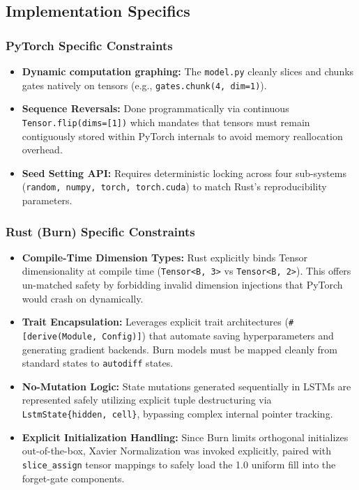 \documentclass[10pt,a4paper,twocolumn]{article}
\begin{document}
\subsection{Implementation Specifics}
\subsubsection{PyTorch Specific Constraints}
\begin{itemize}
    \item \textbf{Dynamic computation graphing:} The \texttt{model.py} cleanly slices and chunks gates natively on tensors (e.g., \texttt{gates.chunk(4, dim=1)}).
    \item \textbf{Sequence Reversals:} Done programmatically via continuous \texttt{Tensor.flip(dims=[1])} which mandates that tensors must remain contiguously stored within PyTorch internals to avoid memory reallocation overhead.
    \item \textbf{Seed Setting API:} Requires deterministic locking across four sub-systems (\texttt{random, numpy, torch, torch.cuda}) to match Rust's reproducibility parameters.
\end{itemize}

\subsubsection{Rust (Burn) Specific Constraints}
\begin{itemize}
    \item \textbf{Compile-Time Dimension Types:} Rust explicitly binds Tensor dimensionality at compile time (\texttt{Tensor<B, 3>} vs \texttt{Tensor<B, 2>}). This offers un-matched safety by forbidding invalid dimension injections that PyTorch would crash on dynamically.
    \item \textbf{Trait Encapsulation:} Leverages explicit trait architectures (\texttt{\#[derive(Module, Config)]}) that automate saving hyperparameters and generating gradient backends. Burn models must be mapped cleanly from standard states to \texttt{autodiff} states.
    \item \textbf{No-Mutation Logic:} State mutations generated sequentially in LSTMs are represented safely utilizing explicit tuple destructuring via \texttt{LstmState\{hidden, cell\}}, bypassing complex internal pointer tracking.
    \item \textbf{Explicit Initialization Handling:} Since Burn limits orthogonal initializes out-of-the-box, Xavier Normalization was invoked explicitly, paired with \texttt{slice\_assign} tensor mappings to safely load the 1.0 uniform fill into the forget-gate components. 
\end{itemize}
\end{document}
